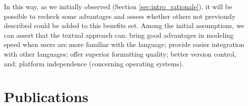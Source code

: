 
In this way, as we initially observed (Section \ref{sec:intro_rationale}), it will be possible to recheck some advantages and assess whether others not previously described could be added to this benefits set.
Among the initial assumptions, we can assert that the textual approach can: bring good advantages in modeling speed when users are more familiar with the language; provide easier integration with other languages; offer superior formatting quality; better version control, and; platform independence (concerning operating systems).

\section{Publications}

